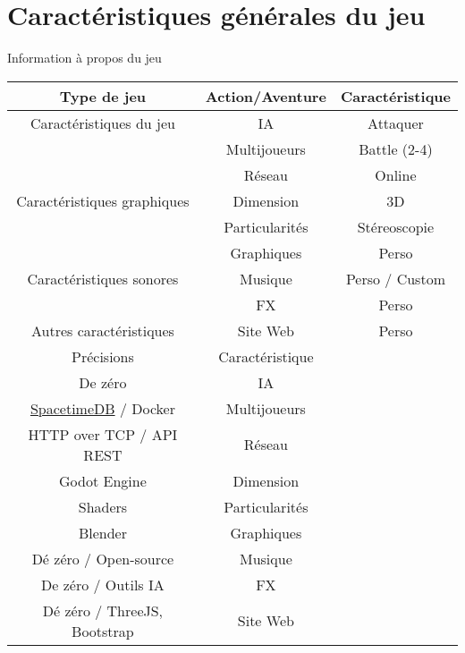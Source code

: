 \documentclass[
	article,			%
	11pt,				%
	oneside,			%
	a4paper,			%
	chapter=TITLE,
	french,			%
	sumario=tradicional
	]{base_nt}
\begin{document}
    \section{Caractéristiques générales du jeu}
    \begin{quadro}
    	\caption{Information à propos du jeu}
    	\centering
    	\begin{tabular}{|c|c|c|}
    		\hline
    		Type de jeu  & Action/Aventure & Caractéristique \\
    		\hline
    		Caractéristiques du jeu & IA & Attaquer \\
    		   & Multijoueurs  & Battle (2-4) \\
                & Réseau & Online \\
                Caractéristiques graphiques & Dimension & 3D \\
                 & Particularités & Stéreoscopie \\
                 & Graphiques & Perso \\
                Caractéristiques sonores & Musique & Perso / Custom \\
                & FX & Perso \\
                Autres caractéristiques & Site Web & Perso \\
    		\hline
    		Précisions & Caractéristique & \\
    		\hline
    		De zéro & IA & \\
    		  \href{https://spacetimedb.com/}{SpacetimeDB} / Docker & Multijoueurs  & \\
                HTTP over TCP / API REST & Réseau & \\
                Godot Engine & Dimension & \\
                 Shaders & Particularités & \\
                 Blender & Graphiques & \\
                Dé zéro / Open-source & Musique &  \\
                De zéro / Outils IA & FX & \\
                Dé zéro / ThreeJS, Bootstrap & Site Web & \\
    		\hline
    	\end{tabular}
    \end{quadro}

    
\end{document}
